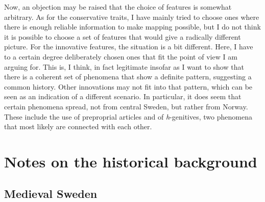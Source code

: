 \begin{styleBodytextC}
Now, an objection may be raised that the choice of features is somewhat arbitrary. As for the conservative traits, I have mainly tried to choose ones where there is enough reliable information to make mapping possible, but I do not think it is possible to choose a set of features that would give a radically different picture. For the innovative features, the situation is a bit different. Here, I have to a certain degree deliberately chosen ones that fit the point of view I am arguing for. This is, I think, in fact legitimate insofar as I want to show that there is a coherent set of phenomena that show a definite pattern, suggesting a common history. Other innovations may not fit into that pattern, which can be seen as an indication of a different scenario. In particular, it does seem that certain phenomena spread, not from central Sweden, but rather from Norway. These include the use of preproprial articles and of \textit{h}{}-genitives, two phenomena that most likely are connected with each other. 

\end{styleBodytextC}

\section{Notes on the historical background}
\subsection{\rmfamily Medieval Sweden}

